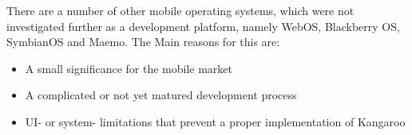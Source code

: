 There are a number of other mobile operating systems, which were not
investigated further as a development platform, namely WebOS, Blackberry OS, SymbianOS and Maemo.
The Main reasons for this are:
\begin{itemize}
  \item A small significance for the mobile market
  \item A complicated or not yet matured development process
  \item UI- or system- limitations that prevent a proper implementation of Kangaroo
\end{itemize}

